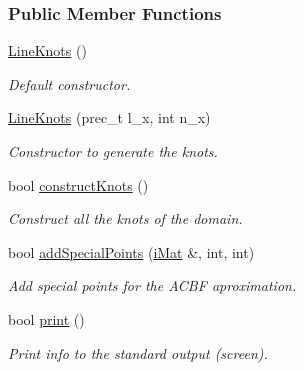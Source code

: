 \subsubsection*{Public Member Functions}
\begin{CompactItemize}
\item 
\hypertarget{classLineKnots_1dcaa84b7356457e0eba68f8e18c4f19}{
\hyperlink{classLineKnots_1dcaa84b7356457e0eba68f8e18c4f19}{LineKnots} ()}
\label{classLineKnots_1dcaa84b7356457e0eba68f8e18c4f19}

\begin{CompactList}\small\item\em Default constructor. \item\end{CompactList}\item 
\hyperlink{classLineKnots_972c8612b36bd7cc82b867de54a488bd}{LineKnots} (prec\_\-t l\_\-x, int n\_\-x)
\begin{CompactList}\small\item\em Constructor to generate the knots. \item\end{CompactList}\item 
bool \hyperlink{classLineKnots_de473737fc4dabcb3c4ce0bb56394e25}{constructKnots} ()
\begin{CompactList}\small\item\em Construct all the knots of the domain. \item\end{CompactList}\item 
bool \hyperlink{classLineKnots_d7bb406664501996f586473b5d61488e}{addSpecialPoints} (\hyperlink{Traits_8hpp_a667f32088e1c93b532a640fe84dc4cd}{iMat} \&, int, int)
\begin{CompactList}\small\item\em Add special points for the ACBF aproximation. \item\end{CompactList}\item 
\hypertarget{classLineKnots_931b21cc69f99013db6e467d9b8b51c6}{
bool \hyperlink{classLineKnots_931b21cc69f99013db6e467d9b8b51c6}{print} ()}
\label{classLineKnots_931b21cc69f99013db6e467d9b8b51c6}

\begin{CompactList}\small\item\em Print info to the standard output (screen). \item\end{CompactList}\end{CompactItemize}
